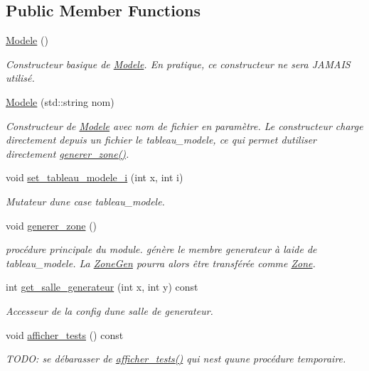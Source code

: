 \subsection*{Public Member Functions}
\begin{DoxyCompactItemize}
\item 
\hyperlink{classModele_ae9d6a289deaebe7e8eeda46693d79d23}{Modele} ()
\begin{DoxyCompactList}\small\item\em Constructeur basique de \hyperlink{classModele}{Modele}. En pratique, ce constructeur ne sera J\+A\+M\+A\+IS utilisé. \end{DoxyCompactList}\item 
\hyperlink{classModele_a14085f4c7825d488f349f262dcc35d13}{Modele} (std\+::string nom)
\begin{DoxyCompactList}\small\item\em Constructeur de \hyperlink{classModele}{Modele} avec nom de fichier en paramètre. Le constructeur charge directement depuis un fichier le {\itshape tableau\+\_\+modele}, ce qui permet d\textquotesingle{}utiliser directement \hyperlink{classModele_aa7d12b096f73bd3cbd25f6ca8ba64662}{generer\+\_\+zone()}. \end{DoxyCompactList}\item 
void \hyperlink{classModele_a8092dd958959388cc830123a2af32d85}{set\+\_\+tableau\+\_\+modele\+\_\+i} (int x, int i)
\begin{DoxyCompactList}\small\item\em Mutateur d\textquotesingle{}une case tableau\+\_\+modele. \end{DoxyCompactList}\item 
void \hyperlink{classModele_aa7d12b096f73bd3cbd25f6ca8ba64662}{generer\+\_\+zone} ()
\begin{DoxyCompactList}\small\item\em procédure principale du module. génère le membre {\itshape generateur} à l\textquotesingle{}aide de {\itshape tableau\+\_\+modele}. La \hyperlink{classZoneGen}{Zone\+Gen} pourra alors être transférée comme \hyperlink{classZone}{Zone}. \end{DoxyCompactList}\item 
int \hyperlink{classModele_a773443b469f018fadc373423912c7eee}{get\+\_\+salle\+\_\+generateur} (int x, int y) const 
\begin{DoxyCompactList}\small\item\em Accesseur de la config d\textquotesingle{}une \textquotesingle{}salle\textquotesingle{} de {\itshape generateur}. \end{DoxyCompactList}\item 
void \hyperlink{classModele_a510474330d38950422a86055aa411cab}{afficher\+\_\+tests} () const 
\begin{DoxyCompactList}\small\item\em T\+O\+DO\+: se débarasser de \hyperlink{classModele_a510474330d38950422a86055aa411cab}{afficher\+\_\+tests()} qui n\textquotesingle{}est qu\textquotesingle{}une procédure temporaire. \end{DoxyCompactList}\end{DoxyCompactItemize}



